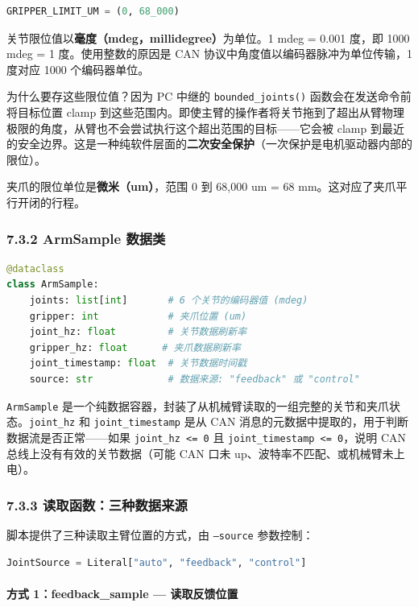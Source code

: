 \documentclass[UTF8,a4paper,11pt]{ctexart}
\begin{document}
{\begin{lstlisting}[language=python]
GRIPPER_LIMIT_UM = (0, 68_000)
\end{lstlisting}

关节限位值以\textbf{毫度（mdeg，millidegree）}为单位。1 mdeg = 0.001 度，即 1000 mdeg = 1 度。使用整数的原因是 CAN 协议中角度值以编码器脉冲为单位传输，1 度对应 1000 个编码器单位。

为什么要存这些限位值？因为 PC 中继的 \texttt{bounded_joints()} 函数会在发送命令前将目标位置 clamp 到这些范围内。即使主臂的操作者将关节拖到了超出从臂物理极限的角度，从臂也不会尝试执行这个超出范围的目标——它会被 clamp 到最近的安全边界。这是一种纯软件层面的\textbf{二次安全保护}（一次保护是电机驱动器内部的限位）。

夹爪的限位单位是\textbf{微米（um）}，范围 0 到 68,000 um = 68 mm。这对应了夹爪平行开闭的行程。

\subsubsection{7.3.2 ArmSample 数据类}

\begin{lstlisting}[language=python]
@dataclass
class ArmSample:
    joints: list[int]       # 6 个关节的编码器值 (mdeg)
    gripper: int            # 夹爪位置 (um)
    joint_hz: float         # 关节数据刷新率
    gripper_hz: float      # 夹爪数据刷新率
    joint_timestamp: float  # 关节数据时间戳
    source: str             # 数据来源: "feedback" 或 "control"
\end{lstlisting}

\texttt{ArmSample} 是一个纯数据容器，封装了从机械臂读取的一组完整的关节和夹爪状态。\texttt{joint_hz} 和 \texttt{joint_timestamp} 是从 CAN 消息的元数据中提取的，用于判断数据流是否正常——如果 \texttt{joint_hz <= 0} 且 \texttt{joint_timestamp <= 0}，说明 CAN 总线上没有有效的关节数据（可能 CAN 口未 up、波特率不匹配、或机械臂未上电）。

\subsubsection{7.3.3 读取函数：三种数据来源}

脚本提供了三种读取主臂位置的方式，由 \texttt{--source} 参数控制：

\begin{lstlisting}[language=python]
JointSource = Literal["auto", "feedback", "control"]
\end{lstlisting}

\paragraph{方式 1：feedback_sample — 读取反馈位置}


}
\end{document}
